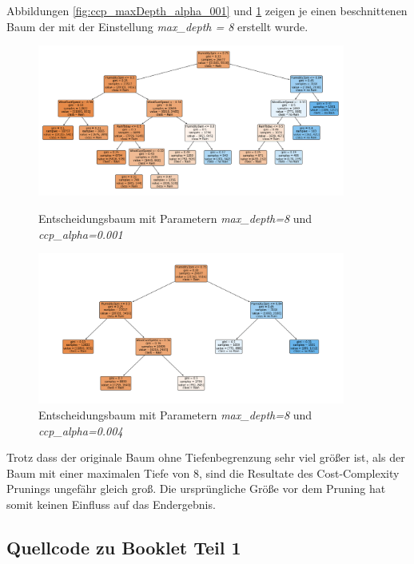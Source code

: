 Abbildungen \ref{fig:ccp_maxDepth_alpha_001} und \ref{fig:ccp_maxDepth_alpha_004} zeigen je einen beschnittenen Baum der mit der Einstellung \emph{max\_depth = 8} erstellt wurde.\\
\begin{figure}[H]
	\centering
	\begin{minipage}{0.45\textwidth}
		\centering
		\includegraphics[width=0.9\textwidth]{Bilder/ccp_maxDepth_alpha_001.png}
		\caption{Entscheidungsbaum mit Parametern \emph{max\_depth=8} und \emph{ccp\_alpha=0.001}}
		\label{fig:ccp_maxDepth_alpha_001}
	\end{minipage}\hfill
	\begin{minipage}{0.45\textwidth}
		\centering
		\includegraphics[width=0.9\textwidth]{Bilder/ccp_maxdepth_alpha_004.png}
		\caption{Entscheidungsbaum mit Parametern \emph{max\_depth=8} und \emph{ccp\_alpha=0.004}}
		\label{fig:ccp_maxDepth_alpha_004}
	\end{minipage}\hfill
\end{figure}
\noindent \hspace*{7mm}
Trotz dass der originale Baum ohne Tiefenbegrenzung sehr viel größer ist, als der Baum mit einer maximalen Tiefe von 8, sind die Resultate des Cost-Complexity Prunings ungefähr gleich groß. Die ursprüngliche Größe vor dem Pruning hat somit keinen Einfluss auf das Endergebnis.
\pagebreak
\subsection{Quellcode zu Booklet Teil 1}


